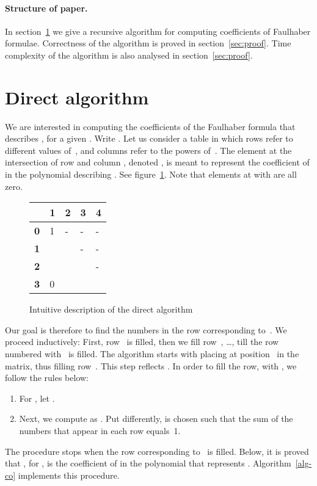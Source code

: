 \documentclass[a4paper,10pt]{amsart}
\theoremstyle{remark}
\begin{document}
\paragraph{Structure of paper.}
In section~\ref{sec:algorithm} we give a recursive algorithm for
computing coefficients of Faulhaber formulae. Correctness of the
algorithm is proved in section~\ref{sec:proof}. Time complexity of the
algorithm is also analysed in section~\ref{sec:proof}.

\section{Direct algorithm} 
\label{sec:algorithm}
We are interested in computing the coefficients of the Faulhaber
formula that describes , for a given .  Write
.
Let us consider a table in which rows refer to different values
of~, and columns refer to the powers of~. The element at the
intersection of row  and column , denoted , is meant
to represent the coefficient of  in the polynomial describing
. See figure~\ref{fig:int}. Note that elements at  with
 are all zero.





\begin{figure}[h]
\begin{center}
\begin{tabular}{|l||l|l|l|l|}
\hline
&{\bf 1} & {\bf 2} & {\bf 3} & {\bf 4}\\
\hline
\hline
{\bf 0}&1 & - & - & -\\
\hline
{\bf 1}& &  & - & -\\
\hline
{\bf 2}& &  & &-\\
\hline
{\bf 3}&0 &  &  & \\
\hline
\end{tabular}
\end{center}
\caption{Intuitive description of the direct algorithm}
\label{fig:int}
\end{figure}

Our goal is therefore to find the numbers in the row corresponding
to~. We proceed inductively: First, row~ is filled,
then we fill row~, \ldots, till the row numbered
with~ is filled.  The algorithm starts with placing  at
position~ in the matrix, thus filling row~. This step
reflects .
In order to fill the  row, with , we follow the
rules below:
\begin{enumerate}
\item
For , let .
\item Next, we compute  as
. Put differently, 
is chosen such that the sum of the numbers that appear in each row
equals~1.
\end{enumerate}
The procedure stops when the row corresponding to~ is
filled. Below, it is proved that , for , is
the coefficient of  in the polynomial that represents .
Algorithm~\ref{alg-co} implements this procedure.
\end{document}
